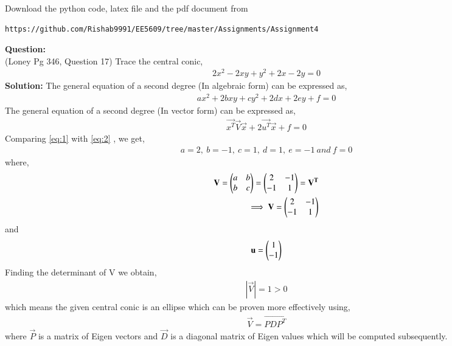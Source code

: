 \documentclass[journal,12pt,twocolumn]{IEEEtran}
\begin{document}
%
Download the python code, latex file and the pdf document from 
\begin{lstlisting}
https://github.com/Rishab9991/EE5609/tree/master/Assignments/Assignment4
\end{lstlisting}
\textbf{Question:}\\
(Loney Pg 346, Question 17)
Trace the central conic,
\begin{align}
2x^2 - 2xy + y^2 + 2x - 2y = 0\label{eq:1}
\end{align}
\textbf{Solution:}
The general equation of a second degree (In algebraic form) can be expressed as,
\begin{align}
ax^2 + 2bxy + cy^2 + 2dx + 2ey + f = 0 \label{eq:2}
\end{align}
The general equation of a second degree (In vector form) can be expressed as,
\begin{align}
\vec{x^T}\vec{V}\vec{x} + 2\vec{u^T}\vec{x} + f = 0
\end{align}
Comparing \eqref{eq:1} with \eqref{eq:2} , we get,
\begin{align}
a = 2, \ b = -1, \ c = 1, \ d = 1, \ e = -1 \ and \ f = 0
\end{align}
where,
\begin{align}
\mathbf{V} = \begin{pmatrix}a & b \\ b & c\end{pmatrix} = \begin{pmatrix}2 & -1 \\ -1 & 1\end{pmatrix} = \mathbf{V^T}\\
\implies \mathbf{V} = \begin{pmatrix}2 & -1 \\ -1 & 1\end{pmatrix}
\end{align}
and
\begin{align}
\mathbf{u} = \begin{pmatrix}1 \\ -1\end{pmatrix}    
\end{align}
Finding the determinant of V we obtain, 
\begin{align}
|\vec{V}| = 1 > 0
\end{align}
which means the given central conic is an ellipse which can be proven more effectively using,
\begin{align}
\vec{V} = \vec{PDP^T}\label{eq:9}    
\end{align}
where $\vec{P}$ is a matrix of Eigen vectors and $\vec{D}$ is a diagonal matrix of Eigen values which will be computed subsequently.\\
\end{document}

